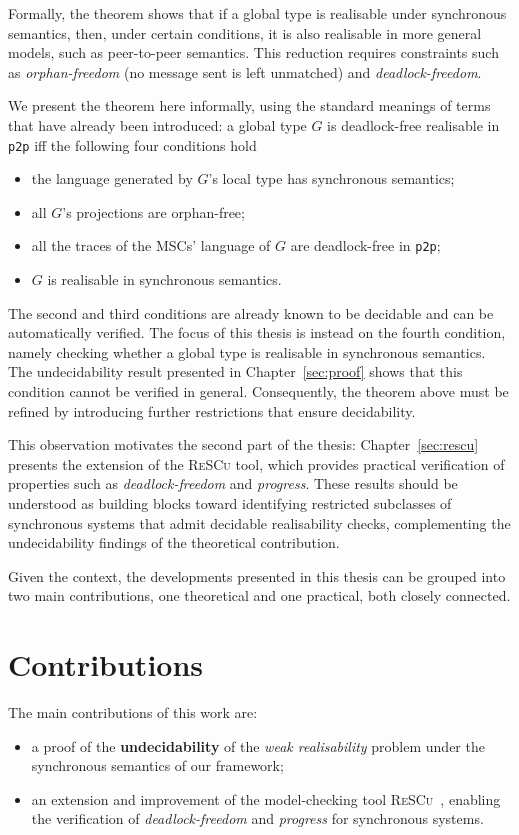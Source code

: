 Formally, the theorem shows that if a global type is realisable under
synchronous semantics, then, under certain conditions, it is also
realisable in more general models, such as peer-to-peer semantics. This
reduction requires constraints such as \emph{orphan-freedom} (no message 
sent is left unmatched) and \emph{deadlock-freedom}.  

We present the theorem here informally, using the standard meanings of
terms that have already been introduced:
a global type $G$ is deadlock-free realisable in \verb|p2p| iff
the following four conditions hold
\begin{itemize}
  \item the language generated by $G$'s local type has synchronous semantics;
  \item all $G$'s projections are orphan-free;
  \item all the traces of the MSCs' language of $G$ are deadlock-free
  in \verb|p2p|;
  \item $G$ is realisable in synchronous semantics.
\end{itemize}

The second and third conditions are already known to be decidable and 
can be automatically verified. The focus of this thesis is instead on 
the fourth condition, namely checking whether a global type is 
realisable in synchronous semantics. The undecidability result 
presented in Chapter~\ref{sec:proof} shows that this condition cannot 
be verified in general. Consequently, the theorem above must be refined 
by introducing further restrictions that ensure decidability.  

This observation motivates the second part of the thesis: 
Chapter~\ref{sec:rescu} presents the extension of the 
\textsc{ReSCu} tool, which provides practical verification of 
properties such as \emph{deadlock-freedom} and \emph{progress}. These 
results should be understood as building blocks toward identifying 
restricted subclasses of synchronous systems that admit decidable 
realisability checks, complementing the undecidability findings of 
the theoretical contribution.

Given the context, the developments presented in this thesis can be 
grouped into two main
contributions, one theoretical and one practical, both closely
connected.

\section{Contributions}
The main contributions of this work are: 
\begin{itemize}
    \item a proof of the \textbf{undecidability} of the 
    \textit{weak realisability} problem under the synchronous 
    semantics of our framework;
    \item an extension and improvement of the model-checking tool 
    \textsc{ReSCu}~\cite{rescurepo}, enabling the verification of 
    \textit{deadlock-freedom} and \textit{progress} for synchronous 
    systems.
\end{itemize}

